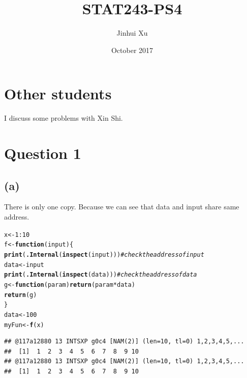 \documentclass{article}\usepackage[]{graphicx}\usepackage[]{color}
\makeatletter
\newcommand{\hlnum}[1]{\textcolor[rgb]{0.686,0.059,0.569}{#1}}%
\newcommand{\hlcom}[1]{\textcolor[rgb]{0.678,0.584,0.686}{\textit{#1}}}%
\newcommand{\hlopt}[1]{\textcolor[rgb]{0,0,0}{#1}}%
\newcommand{\hlstd}[1]{\textcolor[rgb]{0.345,0.345,0.345}{#1}}%
\newcommand{\hlkwa}[1]{\textcolor[rgb]{0.161,0.373,0.58}{\textbf{#1}}}%
\newcommand{\hlkwb}[1]{\textcolor[rgb]{0.69,0.353,0.396}{#1}}%
\newcommand{\hlkwc}[1]{\textcolor[rgb]{0.333,0.667,0.333}{#1}}%
\newcommand{\hlkwd}[1]{\textcolor[rgb]{0.737,0.353,0.396}{\textbf{#1}}}%
\newenvironment{kframe}{%
 \def\at@end@of@kframe{}%
 \ifinner\ifhmode%
  \def\at@end@of@kframe{\end{minipage}}%
  \begin{minipage}{\columnwidth}%
 \fi\fi%
 \def\FrameCommand##1{\hskip\@totalleftmargin \hskip-\fboxsep
 \colorbox{shadecolor}{##1}\hskip-\fboxsep
     \hskip-\linewidth \hskip-\@totalleftmargin \hskip\columnwidth}%
 \MakeFramed {\advance\hsize-\width
   \@totalleftmargin\z@ \linewidth\hsize
   \@setminipage}}%
 {\par\unskip\endMakeFramed%
 \at@end@of@kframe}
\newenvironment{knitrout}{}{} %
\makeatother
\begin{document}
 
\title{STAT243-PS4}
\author{Jinhui Xu}
\date{October 2017}

\maketitle

\section{Other students}
I discuss some problems with Xin Shi.  

\section{Question 1}

\subsection{(a)}
There is only one copy. Because we can see that data and input share same address.
\begin{knitrout}
\color{fgcolor}\begin{kframe}
\begin{alltt}
\hlstd{x} \hlkwb{<-} \hlnum{1}\hlopt{:}\hlnum{10}
\hlstd{f} \hlkwb{<-} \hlkwa{function}\hlstd{(}\hlkwc{input}\hlstd{)\{}
  \hlkwd{print}\hlstd{(}\hlkwd{.Internal}\hlstd{(}\hlkwd{inspect}\hlstd{(input)))}       \hlcom{#check the address of input}
  \hlstd{data} \hlkwb{<-} \hlstd{input}
  \hlkwd{print}\hlstd{(}\hlkwd{.Internal}\hlstd{(}\hlkwd{inspect}\hlstd{(data)))}        \hlcom{#check the address of data}
        \hlstd{g} \hlkwb{<-} \hlkwa{function}\hlstd{(}\hlkwc{param}\hlstd{)} \hlkwd{return}\hlstd{(param} \hlopt{*} \hlstd{data)}
        \hlkwd{return}\hlstd{(g)}
\hlstd{\}}
\hlstd{data}\hlkwb{<-}\hlnum{100}
\hlstd{myFun} \hlkwb{<-} \hlkwd{f}\hlstd{(x)}
\end{alltt}
\begin{verbatim}
## @117a12880 13 INTSXP g0c4 [NAM(2)] (len=10, tl=0) 1,2,3,4,5,...
##  [1]  1  2  3  4  5  6  7  8  9 10
## @117a12880 13 INTSXP g0c4 [NAM(2)] (len=10, tl=0) 1,2,3,4,5,...
##  [1]  1  2  3  4  5  6  7  8  9 10
\end{verbatim}
\end{kframe}
\end{knitrout}
\end{document}
